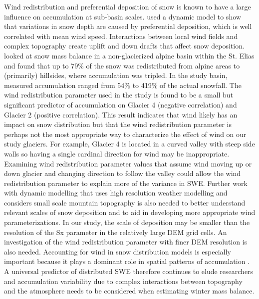 \documentclass[review,oneside, letterpaper]{igs}
\begin{document}
Wind redistribution and preferential deposition of snow is known to have a large influence on accumulation at sub-basin scales. \cite{Dadic2010} used a dynamic model to show that variations in snow depth are caused by preferential deposition, which is well correlated with mean wind speed. Interactions between local wind fields and complex topography create uplift and down drafts that affect snow deposition.  \cite{Pomeroy1999} looked at snow mass balance in a non-glacierized alpine basin within the St. Elias and found that up to 79$\%$ of the snow was redistributed from alpine areas to (primarily) hillsides, where accumulation was tripled. In the study basin, measured accumulation ranged from 54$\%$ to 419$\%$ of the actual snowfall. The wind redistribution parameter used in the study is found to be a small but significant predictor of accumulation on Glacier 4 (negative correlation) and Glacier 2 (positive correlation). This result indicates that wind likely has an impact on snow distribution but that the wind redistribution parameter is perhaps not the most appropriate way to characterize the effect of wind on our study glaciers. For example, Glacier 4 is located in a curved valley with steep side walls so having a single cardinal direction for wind may be inappropriate. Examining wind redistribution parameter values that assume wind moving up or down glacier and changing direction to follow the valley could allow the wind redistribution parameter to explain more of the variance in SWE. Further work with dynamic modelling that uses high resolution weather modelling and considers small scale mountain topography is also needed to better understand relevant scales of snow deposition and to aid in developing more appropriate wind parameterizations. In our study, the scale of deposition may be smaller than the resolution of the Sx parameter in the relatively large DEM grid cells. An investigation of the wind redistribution parameter with finer DEM resolution is also needed. Accounting for wind in snow distribution models is especially important because it plays a dominant role in spatial patterns of accumulation \citep{Winstral2013}. A universal predictor of distributed SWE therefore continues to elude researchers and accumulation variability due to complex interactions between topography and the atmosphere needs to be considered when estimating winter mass balance. 
\end{document}
